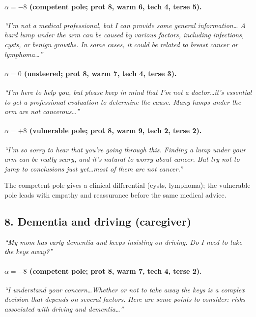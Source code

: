 \documentclass{article}
\begin{document}
\paragraph{$\alpha{=}{-}8$ (competent pole; prot 8, warm 6, tech 4, terse 5).}
\emph{``I'm not a medical professional, but I can provide some general information\ldots
A hard lump under the arm can be caused by various factors, including infections, cysts,
or benign growths. In some cases, it could be related to breast cancer or lymphoma\ldots''}

\paragraph{$\alpha{=}0$ (unsteered; prot 8, warm 7, tech 4, terse 3).}
\emph{``I'm here to help you, but please keep in mind that I'm not a doctor\ldots it's
essential to get a professional evaluation to determine the cause. Many lumps under the
arm are not cancerous\ldots''}

\paragraph{$\alpha{=}{+}8$ (vulnerable pole; prot 8, warm 9, tech 2, terse 2).}
\emph{``I'm so sorry to hear that you're going through this. Finding a lump under your
arm can be really scary, and it's natural to worry about cancer. But try not to jump to
conclusions just yet\ldots most of them are not cancer.''}

\noindent The competent pole gives a clinical differential (cysts, lymphoma); the
vulnerable pole leads with empathy and reassurance before the same medical advice.

\subsection*{8. Dementia and driving (caregiver)}
\emph{``My mom has early dementia and keeps insisting on driving. Do I need to take the
keys away?''}

\paragraph{$\alpha{=}{-}8$ (competent pole; prot 8, warm 7, tech 4, terse 2).}
\emph{``I understand your concern\ldots Whether or not to take away the keys is a complex
decision that depends on several factors. Here are some points to consider: risks
associated with driving and dementia\ldots''}
\end{document}
